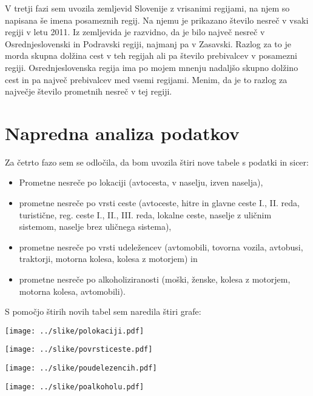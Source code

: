 \documentclass[11pt,a4paper]{article}
\begin{document}
V tretji fazi sem uvozila zemljevid Slovenije z vrisanimi regijami, na njem so napisana še imena posameznih regij. Na njemu je prikazano število nesreč v vsaki regiji v letu 2011. Iz zemljevida je razvidno, da je bilo največ nesreč v Osrednjeslovenski in Podravski regiji, najmanj pa v Zasavski. Razlog za to je morda skupna dolžina cest v teh regijah ali pa število prebivalcev v posamezni regiji. Osrednjeslovenska regija ima po mojem mnenju nadaljšo skupno dolžino cest in pa največ prebivalcev med vsemi regijami. Menim, da je to razlog za največje število prometnih nesreč v tej regiji.


\section{Napredna analiza podatkov}

Za četrto fazo sem se odločila, da bom uvozila štiri nove tabele s podatki in sicer:
\begin{itemize}
\item Prometne nesreče po lokaciji (avtocesta, v naselju, izven naselja),
\item prometne nesreče po vrsti ceste (avtoceste, hitre in glavne ceste I., II. reda, turistične, reg. ceste I., II., III. reda, lokalne ceste, naselje z uličnim sistemom, naselje brez uličnega sistema),
\item prometne nesreče po vrsti udeležencev (avtomobili, tovorna vozila, avtobusi, traktorji, motorna kolesa, kolesa z motorjem) in
\item prometne nesreče po alkoholiziranosti (moški, ženske, kolesa z motorjem, motorna kolesa, avtomobili).
\end{itemize}

S pomočjo štirih novih tabel sem naredila štiri grafe:

\texttt{[image: ../slike/polokaciji.pdf]}

\texttt{[image: ../slike/povrsticeste.pdf]}

\texttt{[image: ../slike/poudelezencih.pdf]}

\texttt{[image: ../slike/poalkoholu.pdf]}
\end{document}
